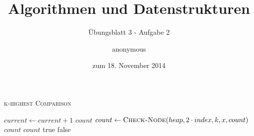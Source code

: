 \documentclass[a4paper]{scrartcl}
\title{Algorithmen und Datenstrukturen}
\subtitle{Übungsblatt 3 - Aufgabe 2}
\author{
    anonymous
}
\date{zum 18. November 2014}
\begin{document}
\maketitle


\begin{algorithm}
    \caption{\textsc{k-highest Comparison}}
    \begin{algorithmic}[1]
            \State $current \gets current + 1$
                \State \Return $count$
            \EndIf
            \State $count \gets \Call{Check-Node}{heap, 2 \cdot index, k, x, count}$
                \State \Return $count$
            \EndIf
            \State \Return {}
        \EndIf
        \State \Return $count$
        \EndProcedure
            \State \Return true
        \Else
            \State \Return false
        \EndIf
        \EndProcedure
    \end{algorithmic}
\end{algorithm}
\end{document}
